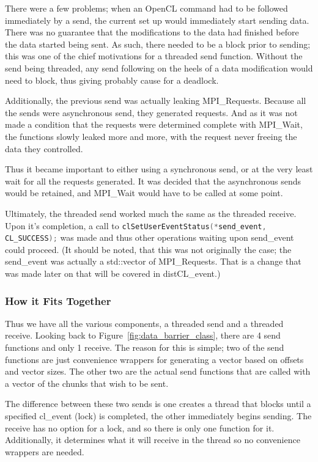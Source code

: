 \documentclass[../thesis.tex]{subfiles}
\begin{document}
    There were a few problems; when an OpenCL command had to be followed immediately by a send, the current set up would immediately start sending data. There was no guarantee that the modifications to the data had finished before the data started being sent. As such, there needed to be a block prior to sending; this was one of the chief motivations for a threaded send function. Without the send being threaded, any send following on the heels of a data modification would need to block, thus giving probably cause for a deadlock.

    Additionally, the previous send was actually leaking MPI\_Requests\cite{leakingmpi}. Because all the sends were asynchronous send, they generated requests. And as it was not made a condition that the requests were determined complete with MPI\_Wait, the functions slowly leaked more and more, with the request never freeing the data they controlled.

    Thus it became important to either using a synchronous send, or at the very least wait for all the requests generated. It was decided that the asynchronous sends would be retained, and MPI\_Wait would have to be called at some point.

    Ultimately, the threaded send worked much the same as the threaded receive. Upon it's completion, a call to \lstinline[language=cpp]{clSetUserEventStatus(*send_event, CL_SUCCESS);} was made and thus other operations waiting upon send\_event could proceed. (It should be noted, that this was not originally the case; the send\_event was actually a std::vector of MPI\_Requests. That is a change that was made later on that will be covered in distCL\_event.)

  \subsubsection{How it Fits Together} %
  \label{ssub:how_it_fits_together}
    Thus we have all the various components, a threaded send and a threaded receive. Looking back to Figure~\ref{fig:data_barrier_class}, there are 4 send functions and only 1 receive. The reason for this is simple; two of the send functions are just convenience wrappers for generating a vector based on offsets and vector sizes. The other two are the actual send functions that are called with a vector of the chunks that wish to be sent.

    The difference between these two sends is one creates a thread that blocks until a specified cl\_event (lock) is completed, the other immediately begins sending. The receive has no option for a lock, and so there is only one function for it. Additionally, it determines what it will receive in the thread so no convenience wrappers are needed.
\end{document}
